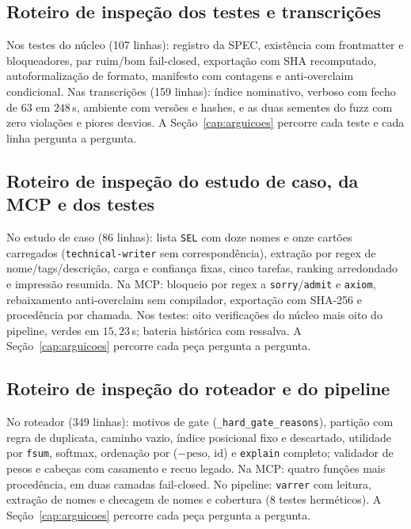 \subsection{Roteiro de inspeção dos testes e transcrições}
Nos testes do núcleo (107 linhas): registro da SPEC, existência com frontmatter e bloqueadores, par ruim/bom fail-closed, exportação com SHA recomputado, autoformalização de formato, manifesto com contagens e anti-overclaim condicional. Nas transcrições (159 linhas): índice nominativo, verboso com fecho de 63 em $248$\,s, ambiente com versões e hashes, e as duas sementes do fuzz com zero violações e piores desvios. A Seção~\ref{cap:arguicoes} percorre cada teste e cada linha pergunta a pergunta.
\subsection{Roteiro de inspeção do estudo de caso, da MCP e dos testes}
No estudo de caso (86 linhas): lista \texttt{SEL} com doze nomes e onze cartões carregados (\texttt{technical-writer} sem correspondência), extração por regex de nome/tags/descrição, carga e confiança fixas, cinco tarefas, ranking arredondado e impressão resumida. Na MCP: bloqueio por regex a \texttt{sorry}/\texttt{admit} e \texttt{axiom}, rebaixamento anti-overclaim sem compilador, exportação com SHA-256 e procedência por chamada. Nos testes: oito verificações do núcleo mais oito do pipeline, verdes em $15{,}23$\,s; bateria histórica com ressalva. A Seção~\ref{cap:arguicoes} percorre cada peça pergunta a pergunta.
\subsection{Roteiro de inspeção do roteador e do pipeline}
No roteador (349 linhas): motivos de gate (\texttt{\_hard\_gate\_reasons}), partição com regra de duplicata, caminho vazio, índice posicional fixo e descartado, utilidade por \texttt{fsum}, softmax, ordenação por ($-\mathrm{peso}$, $\mathrm{id}$) e \texttt{explain} completo; validador de pesos e cabeças com casamento e recuo legado. Na MCP: quatro funções mais procedência, em duas camadas fail-closed. No pipeline: \texttt{varrer} com leitura, extração de nomes e checagem de nomes e cobertura (8 testes herméticos). A Seção~\ref{cap:arguicoes} percorre cada peça pergunta a pergunta.
